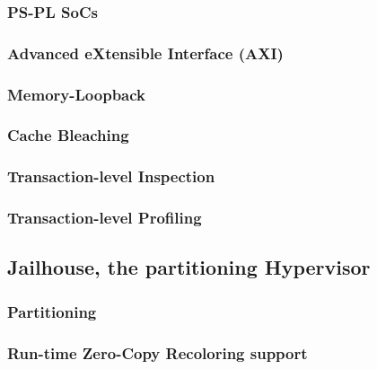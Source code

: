 \subsubsection{PS-PL SoCs}
\subsubsection{Advanced eXtensible Interface (AXI)}
\subsubsection{Memory-Loopback}
\subsubsection{Cache Bleaching}
\subsubsection{Transaction-level Inspection}
\subsubsection{Transaction-level Profiling}

\subsection{Jailhouse, the partitioning Hypervisor}
\subsubsection{Partitioning}
        \subsubsection{Run-time Zero-Copy Recoloring support}
